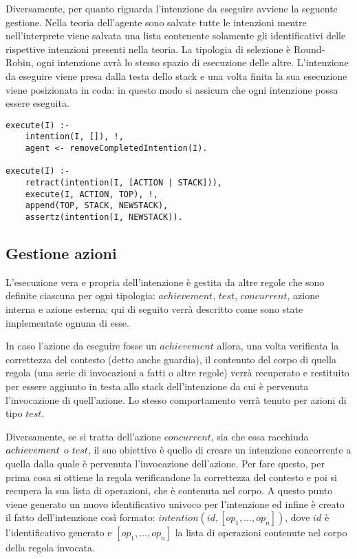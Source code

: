 Diversamente, per quanto riguarda l'intenzione da eseguire avviene la seguente gestione.
Nella teoria dell'agente sono salvate tutte le intenzioni mentre nell'interprete viene salvata una lista contenente solamente gli identificativi delle rispettive intenzioni presenti nella teoria. La tipologia di selezione è Round-Robin, ogni intenzione avrà lo stesso spazio di esecuzione delle altre. L'intenzione da eseguire viene presa dalla testa dello stack e una volta finita la sua esecuzione viene posizionata in coda: in questo modo si assicura che ogni intenzione possa essere eseguita.

\switchToProlog{}
\begin{lstlisting}[float, firstnumber=1,label={lst:ImplementazioneRegoleInvocazioneEsecuzioneIntenzione},caption={Implementazione regole per invocazione esecuzione di un'intenzione}]
execute(I) :-
    intention(I, []), !,
    agent <- removeCompletedIntention(I).

execute(I) :-
    retract(intention(I, [ACTION | STACK])),
    execute(I, ACTION, TOP), !,
    append(TOP, STACK, NEWSTACK),
    assertz(intention(I, NEWSTACK)).
\end{lstlisting}

\subsection{Gestione azioni}\label{sctn:GestioneAzioni}
L'esecuzione vera e propria dell'intenzione è gestita da altre regole che sono definite ciascuna per ogni tipologia: $achievement$, $test$, $concurrent$, azione interna e azione esterna; qui di seguito verrà descritto come sono state implementate ognuna di esse.

In caso l'azione da eseguire fosse un $achievement$ allora, una volta verificata la correttezza del contesto (detto anche guardia), il contenuto del corpo di quella regola (una serie di invocazioni a fatti o altre regole) verrà recuperato e restituito per essere aggiunto in testa allo stack dell'intenzione da cui è pervenuta l'invocazione di quell'azione. Lo stesso comportamento verrà tenuto per azioni di tipo $test$.

Diversamente, se si tratta dell'azione $concurrent$, sia che essa racchiuda $achieve\-ment$ o $test$, il suo obiettivo è quello di creare un intenzione concorrente a quella dalla quale è pervenuta l'invocazione dell'azione. Per fare questo, per prima cosa si ottiene la regola verificandone la correttezza del contesto e poi si recupera la sua lista di operazioni, che è contenuta nel corpo.
A questo punto viene generato un nuovo identificativo univoco per l'intenzione ed infine è creato il fatto dell'intenzione così formato: $intention(id, [op_1, \ldots, op_n])$, dove $id$ è l'identificativo generato e $[op_1, \ldots, op_n]$ la lista di operazioni contenute nel corpo della regola invocata.

